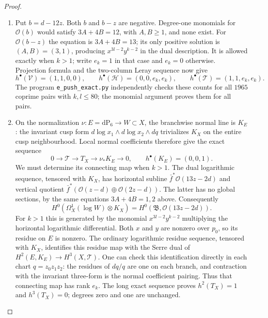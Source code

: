 \begin{proof}
\begin{enumerate}[label=\arabic*.,leftmargin=*]
\item Put $b=d-12z$.  Both $b$ and $b-z$ are negative.
Degree-one monomials for $\mathcal O(b)$ would satisfy
$3A+4B=12$, with $A,B\ge1$, and none exist.
For $\mathcal O(b-z)$ the equation is $3A+4B=13$;
its only positive solution is $(A,B)=(3,1)$, producing
$x^{3l-2}y^{k-2}$ in the dual description.  It is allowed
exactly when $k>1$; write $e_k=1$ in that case and $e_k=0$
otherwise.  Projection formula and the two-column Leray sequence
now give
\[
 h^\bullet(\mathcal V)=(1,1,0,0),\qquad
 h^\bullet(\mathcal H)=(0,0,e_k,e_k),\qquad
 h^\bullet(\mathcal T)=(1,1,e_k,e_k).
\]
The program \texttt{e\_push\_exact.py} independently checks these
counts for all $1965$ coprime pairs with $k,l\le80$; the monomial
argument proves them for all pairs.

\item On the normalization $\nu:E=\mathrm{dP}_6\to W\subset X$,
the branchwise normal line is $K_E$: the invariant cusp form
$d\log x_1\wedge d\log x_2\wedge dq$ trivializes $K_X$
on the entire cusp neighbourhood.  Local normal coefficients
therefore give the exact sequence
\[
 0\longrightarrow\mathcal T\longrightarrow T_X
 \longrightarrow\nu_*K_E\longrightarrow0,
 \qquad h^\bullet(K_E)=(0,0,1).
\]
We must determine its connecting map when $k>1$.
The dual logarithmic sequence, tensored with $K_X$, has horizontal
subline $\bar f^*\mathcal O(13z-2d)$ and vertical quotient
$\bar f^*(\mathcal O(z-d)\oplus\mathcal O(2z-d))$.
The latter has no global sections, by the same equations
$3A+4B=1,2$ above.  Consequently
\[
 H^0(\Omega_X^1(\log W)\otimes K_X)
 =H^0(\mathfrak B,\mathcal O(13z-2d)).
\]
For $k>1$ this is generated by the monomial
$x^{3l-2}y^{k-2}$ multiplying the horizontal logarithmic
differential.  Both $x$ and $y$ are nonzero over $p_0$, so its
residue on $E$ is nonzero.  The ordinary logarithmic residue
sequence, tensored with $K_X$, identifies this residue map with
the Serre dual of
$H^2(E,K_E)\to H^3(X,\mathcal T)$.
One can check this identification directly in each chart
$q=z_0z_1z_2$: the residues of $dq/q$ are one on each branch,
and contraction with the invariant three-form is the normal
coefficient pairing.  Thus that connecting map has rank $e_k$.
The long exact sequence proves $h^2(T_X)=1$ and $h^3(T_X)=0$;
degrees zero and one are unchanged.


\end{enumerate}
\end{proof}
